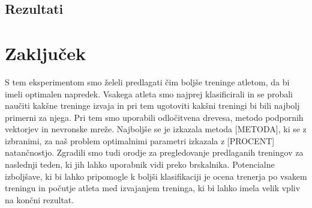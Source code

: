 \documentclass{acm_proc_article-sp}
\begin{document}
\subsection{Rezultati}


\section{Zaključek}
S tem eksperimentom smo želeli predlagati čim boljše treninge atletom, da bi imeli optimalen napredek.
Vsakega atleta smo najprej klasificirali in se probali naučiti kakšne treninge izvaja in pri tem ugotoviti kakšni treningi bi bili najbolj primerni za njega.
Pri tem smo uporabili odločitvena drevesa, metodo podpornih vektorjev in nevronske mreže.
Najboljše se je izkazala metoda [METODA], ki se z izbranimi, za naš problem optimalnimi parametri izkazala z [PROCENT] natančnostjo.
Zgradili smo tudi orodje za pregledovanje predlaganih treningov za naslednji teden, ki jih lahko uporabnik vidi preko brskalnika.
Potencialne izboljšave, ki bi lahko pripomogle k boljši klasifikaciji je ocena trenerja po vsakem treningu in počutje atleta med izvajanjem treninga, ki bi lahko imela velik vpliv na končni rezultat.

%

%
%

\balancecolumns
\end{document}
